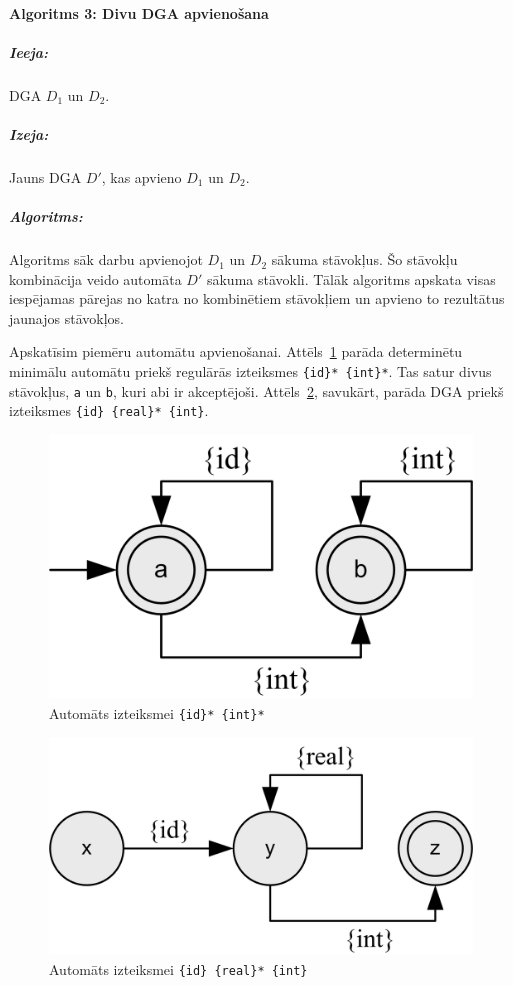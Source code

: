 \paragraph*{Algoritms 3: Divu DGA apvienošana}
\subparagraph{Ieeja:}DGA $D_1$ un $D_2$.
\subparagraph{Izeja:}Jauns DGA $D'$, kas apvieno $D_1$ un $D_2$.
\subparagraph{Algoritms:} 

Algoritms sāk darbu apvienojot $D_1$ un $D_2$ sākuma stāvokļus. Šo stāvokļu kombinācija veido automāta $D'$ sākuma stāvokli. Tālāk algoritms apskata visas iespējamas pārejas no katra no kombinētiem stāvokļiem un apvieno to rezultātus jaunajos stāvokļos. 

Apskatīsim piemēru automātu apvienošanai. Attēls~\ref{fig:auto_m_1} parāda determinētu minimālu automātu priekš regulārās izteiksmes \verb|{id}* {int}*|. Tas satur divus stāvokļus, \verb|a| un \verb|b|, kuri abi ir akceptējoši. Attēls~\ref{fig:auto_m_2}, savukārt, parāda DGA priekš izteiksmes \verb|{id} {real}* {int}|.

\begin{figure}[H]
  \centering
    \includegraphics[scale=1.5]{pictures/auto_m_1}
  \caption{\label{fig:auto_m_1}Automāts izteiksmei \texttt{\{id\}* \{int\}*}}
\end{figure}

\begin{figure}[H]
  \centering
    \includegraphics[scale=1.5]{pictures/auto_m_2}
  \caption{\label{fig:auto_m_2}Automāts izteiksmei \texttt{\{id\} \{real\}* \{int\}}}
\end{figure}

